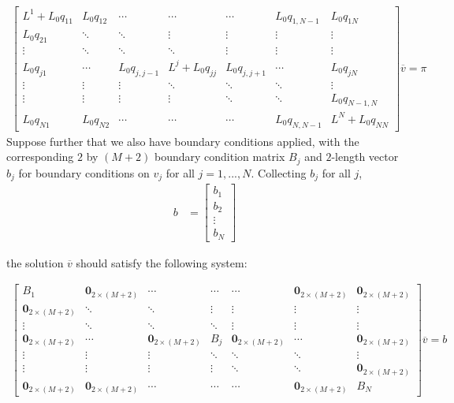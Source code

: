\documentclass[11pt]{article}
\theoremstyle{definition}
\begin{document}
\begin{align}
\begin{bmatrix}
{L}^1 + L_0 q_{11} & L_0 q_{12} & \cdots &  \cdots & \cdots & L_0 q_{1,N-1} & L_0 q_{1N} \\ 
L_0 q_{21} & \ddots & \ddots & \vdots & \vdots & \vdots & \vdots  \\
\vdots & \ddots & \ddots & \ddots  & \vdots & \vdots & \vdots
\\
L_0 q_{j1} &  \cdots & L_0 q_{j,j-1} & {L}^j + L_0 q_{jj} & L_0 q_{j,j+1} & \cdots & L_0 q_{jN} \\
\vdots & \vdots& \vdots &  \ddots & \ddots & \ddots  & \vdots \\ 
\vdots & \vdots  & \vdots& \vdots &  \ddots & \ddots & L_0 q_{N-1,N} \\
L_0 q_{N1} & L_0 q_{N2} & \cdots &  \cdots & \cdots & L_0 q_{N,N-1} & {L}^N + L_0 q_{NN} 
\end{bmatrix}
\overline{v}
=
\pi \label{eq:continuous-and-discrete-system-discrete-larger-states}
\end{align}
Suppose further that we also have boundary conditions applied, with the corresponding $2$ by $(M+2)$ boundary condition matrix $B_j$ and $2$-length vector $b_j$ for boundary conditions on $v_j$ for all $j = 1,..., N$. Collecting $b_j$ for all $j$,
\begin{align}
b &=
\begin{bmatrix}
b_1 \\
b_2 \\
\vdots \\
b_N
\end{bmatrix}
\end{align}

the solution $\overline{v}$ should satisfy the following system:

\begin{align}
\begin{bmatrix}
B_1 & \mathbf{0}_{2 \times (M+2)} & \cdots &  \cdots & \cdots & \mathbf{0}_{2 \times (M+2)}  & \mathbf{0}_{2 \times (M+2)} \\ 
\mathbf{0}_{2 \times (M+2)} & \ddots & \ddots & \vdots & \vdots & \vdots & \vdots  \\
\vdots & \ddots & \ddots & \ddots  & \vdots & \vdots & \vdots
\\
\mathbf{0}_{2 \times (M+2)} &  \cdots & \mathbf{0}_{2 \times (M+2)} & B_j & \mathbf{0}_{2 \times (M+2)} & \cdots & \mathbf{0}_{2 \times (M+2)} \\
\vdots & \vdots& \vdots &  \ddots & \ddots & \ddots  & \vdots \\ 
\vdots & \vdots  & \vdots& \vdots &  \ddots & \ddots & \mathbf{0}_{2 \times (M+2)} \\
\mathbf{0}_{2 \times (M+2)} & \mathbf{0}_{2 \times (M+2)} & \cdots &  \cdots & \cdots & \mathbf{0}_{2 \times (M+2)} & B_N
\end{bmatrix}
\overline{v}
=
b 
\end{align}
\end{document}
